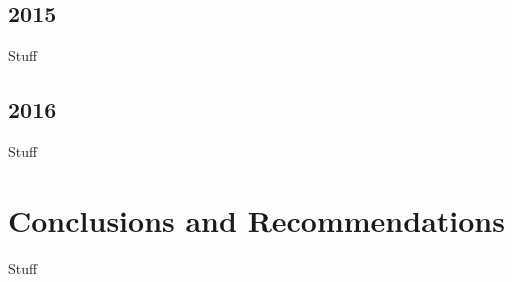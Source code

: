 \documentclass[12pt]{article}
\begin{document}
\subsection{2015}
\begin{flushleft}
Stuff

\end{flushleft}

\subsection{2016}
\begin{flushleft}
Stuff

\end{flushleft}

\section{Conclusions and Recommendations}
\begin{flushleft}
Stuff

\end{flushleft}
\end{document}
